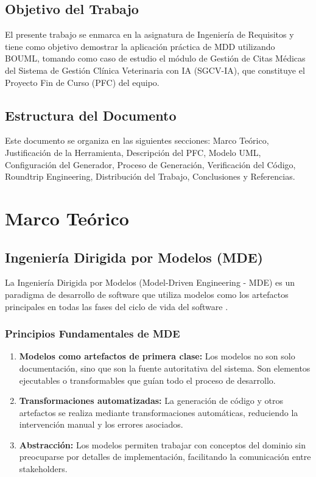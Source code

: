 \documentclass[12pt,a4paper]{article}
\begin{document}
\subsection{Objetivo del Trabajo}

El presente trabajo se enmarca en la asignatura de Ingeniería de Requisitos y tiene como objetivo demostrar la aplicación práctica de MDD utilizando BOUML, tomando como caso de estudio el módulo de Gestión de Citas Médicas del Sistema de Gestión Clínica Veterinaria con IA (SGCV-IA), que constituye el Proyecto Fin de Curso (PFC) del equipo.

\subsection{Estructura del Documento}

Este documento se organiza en las siguientes secciones: Marco Teórico, Justificación de la Herramienta, Descripción del PFC, Modelo UML, Configuración del Generador, Proceso de Generación, Verificación del Código, Roundtrip Engineering, Distribución del Trabajo, Conclusiones y Referencias.

\newpage
\section{Marco Teórico}

\subsection{Ingeniería Dirigida por Modelos (MDE)}

La Ingeniería Dirigida por Modelos (Model-Driven Engineering - MDE) es un paradigma de desarrollo de software que utiliza modelos como los artefactos principales en todas las fases del ciclo de vida del software \cite{schmidt2006}. 

\subsubsection{Principios Fundamentales de MDE}

\begin{enumerate}
    \item \textbf{Modelos como artefactos de primera clase:} Los modelos no son solo documentación, sino que son la fuente autoritativa del sistema. Son elementos ejecutables o transformables que guían todo el proceso de desarrollo.
    \item \textbf{Transformaciones automatizadas:} La generación de código y otros artefactos se realiza mediante transformaciones automáticas, reduciendo la intervención manual y los errores asociados.
    \item \textbf{Abstracción:} Los modelos permiten trabajar con conceptos del dominio sin preocuparse por detalles de implementación, facilitando la comunicación entre stakeholders.
\end{enumerate}
\end{document}
